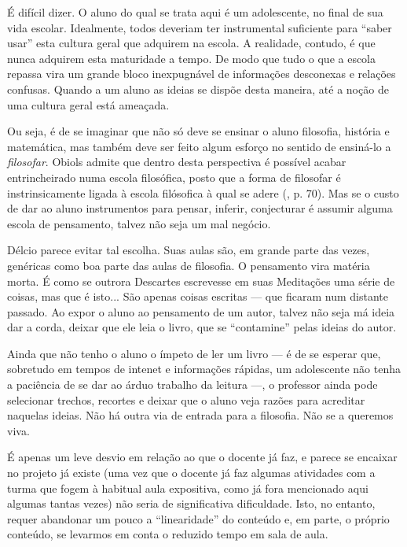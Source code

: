 \documentclass[12pt,a4paper]{article}
\begin{document}
	É difícil dizer. O aluno do qual se trata aqui é um adolescente, no final 
	de sua vida escolar. Idealmente, todos deveriam ter instrumental 
	suficiente para ``saber usar'' esta cultura geral que adquirem na escola. 
	A realidade, contudo, é que nunca adquirem esta maturidade a tempo. De 
	modo que tudo o que a escola repassa vira um grande bloco inexpugnável de 
	informações desconexas e relações confusas. Quando a um aluno as ideias 
	se dispõe desta maneira, até a noção de uma cultura geral está ameaçada. 
	
	Ou seja, é de se imaginar que não só deve se ensinar o aluno filosofia, 
	história e matemática, mas também deve ser feito algum esforço no sentido 
	de ensiná-lo a \textit{filosofar}. Obiols admite que dentro desta 
	perspectiva é possível acabar entrincheirado numa escola filosófica, posto 
	que a forma de filosofar é instrinsicamente ligada à escola filósofica à 
	qual se adere (\cite{obiols}, p. 70). Mas se o custo de dar ao aluno 
	instrumentos para pensar, inferir, conjecturar é assumir alguma escola 
	de pensamento, talvez não seja um mal negócio. 
	
	Délcio parece evitar tal escolha. Suas aulas são, em grande parte das 
	vezes, genéricas como boa parte das aulas de filosofia. O pensamento 
	vira matéria morta. É como se outrora Descartes escrevesse em suas 
	Meditações uma série de coisas, mas que é isto... São apenas coisas 
	escritas --- que ficaram num distante passado. Ao expor o aluno ao 
	pensamento de um autor, talvez não seja má ideia dar a corda, deixar 
	que ele leia o livro, que se ``contamine'' pelas ideias do autor. 
	
	Ainda que não tenho o aluno o ímpeto de ler um livro --- é de se 
	esperar que, sobretudo em tempos de intenet e informações rápidas, 
	um adolescente não tenha a paciência de se dar ao árduo trabalho da 
	leitura ---, o professor ainda pode selecionar trechos, recortes 
	e deixar que o aluno veja razões para acreditar naquelas ideias. 
	Não há outra via de entrada para a filosofia. Não se a queremos viva. 
	
	É apenas um leve desvio em relação ao que o docente já faz, e parece 
	se encaixar no projeto já existe (uma vez que o docente já faz algumas 
	atividades com a turma que fogem à habitual aula expositiva, como já 
	fora mencionado aqui algumas tantas vezes) não seria de significativa 
	dificuldade. Isto, no entanto, requer abandonar um pouco a ``linearidade'' 
	do conteúdo e, em parte, o próprio conteúdo, se levarmos em conta o 
	reduzido tempo em sala de aula. 
	
\end{document}
